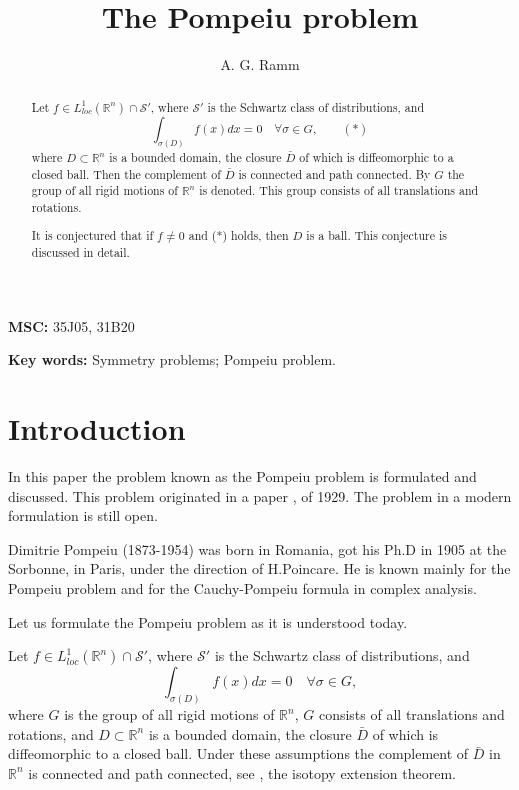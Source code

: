 \documentclass[12pt,leqno]{article}
\def\R{\mathbb{R}}
\begin{document}
\baselineskip=16pt

\title{The Pompeiu problem}

\author{ A. G. Ramm
}

\renewcommand{\thefootnote}{\fnsymbol{footnote}}

\date{}
\maketitle
\begin{abstract}
\baselineskip=14pt
Let $f \in L_{loc}^1 (\R^n)\cap \mathcal{S}'$, where
$\mathcal{S}'$ is the Schwartz class of distributions,  and
$$\int_{\sigma (D)} f(x) dx = 0 \quad \forall \sigma \in G, \qquad (*)$$
where  $D\subset \R^n$ is a bounded domain, the closure $\bar{D}$ of
which is diffeomorphic to a closed ball. Then the complement of $\bar{D}$
is connected and path connected.
By $G$ the group of all rigid motions of $\R^n$ is denoted. This group
consists of all translations and rotations.

It is conjectured that if $f\neq 0$ and (*) holds, then $D$ is a ball.
This conjecture is discussed in detail.

\end{abstract}

\textbf{MSC:} 35J05, 31B20

\textbf{Key words:} Symmetry problems; Pompeiu problem.

\section{Introduction}
In this paper the problem known as the Pompeiu problem is formulated and
discussed. This problem originated in a paper \cite{P}, of 1929.
The problem in a modern formulation is still open.

Dimitrie  Pompeiu (1873-1954) was born in Romania, got his Ph.D in 1905 at
the Sorbonne, in Paris, under the direction of H.Poincare. He is known
mainly for the Pompeiu problem and for the Cauchy-Pompeiu formula in
complex analysis.

Let us formulate the Pompeiu problem as it is understood today.

Let $f \in L_{loc}^1 (\R^n)\cap \mathcal {S}'$, where
$\mathcal{S}'$ is the Schwartz class of distributions,  and
\begin{equation}
\label{e1}
\int_{\sigma (D)} f(x) dx = 0 \quad \forall \sigma \in G,
\end{equation}
where $G$  is the group of all rigid motions of $\R^n$, $G$  consists of
all translations and rotations, and
 $D\subset \R^n$ is a bounded domain, the closure $\bar{D}$ of
which is diffeomorphic to a closed ball. Under these assumptions the
complement of $\bar{D}$
in $\R^n$ is connected and path connected, see \cite{H}, the isotopy
extension theorem.
\end{document}
